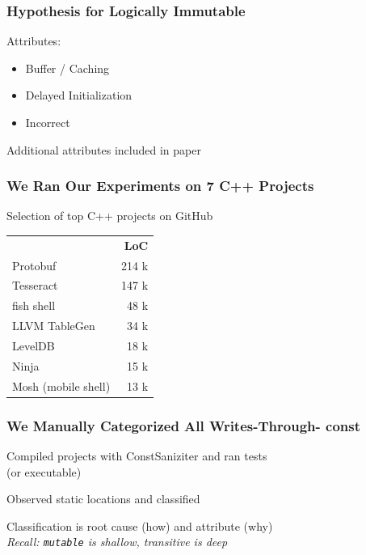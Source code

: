 \documentclass[aspectratio=43]{beamer}
\newcommand{\const}{{\color{blue} \bfseries \ttfamily const}}
\begin{document}
  \begin{frame}
    \frametitle{Hypothesis for Logically Immutable}
    \large
    Attributes:
    \vspace{1mm}
    \begin{itemize}
      \setlength\itemsep{0.5em}
      \item Buffer / Caching
      \item Delayed Initialization
      \item Incorrect
    \end{itemize}

    \vspace{2em}
    Additional attributes included in paper
  \end{frame}

  \begin{frame}
    \frametitle{We Ran Our Experiments on 7 C++ Projects}
    \large
    Selection of top C++ projects on GitHub

    \centering
    \vspace{1.5em}
    \begin{tabular}{l r}
      & \textbf{LoC} \\

      Protobuf & 214 k\\
      Tesseract & 147 k \\
      fish shell & 48 k \\
      LLVM TableGen & 34 k \\
      LevelDB & 18 k \\
      Ninja & 15 k \\
      Mosh (mobile shell) & 13 k \\
    \end{tabular}
  \end{frame}

  \begin{frame}
    \frametitle{We Manually Categorized All Writes-Through-\const{}}
    \large
    Compiled projects with ConstSaniziter and ran tests\\(or executable)

    \vspace{2em}
    Observed static locations and classified

    \vspace{2em}
    Classification is root cause (how) and attribute (why)\\
    \textit{Recall: \texttt{mutable} is shallow, transitive is deep}
  \end{frame}
\end{document}
